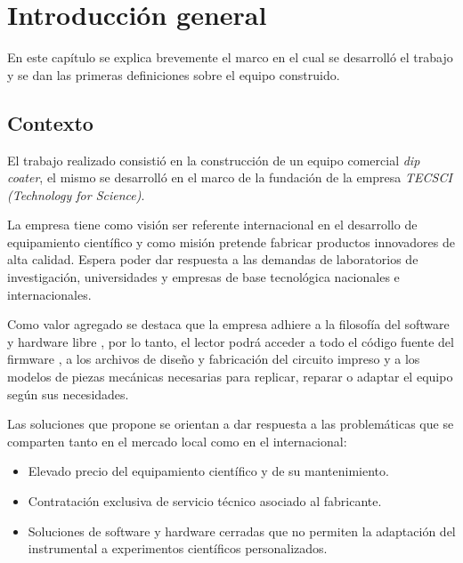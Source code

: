 
\chapter{Introducción general} %

\label{Chapter1} %


En este capítulo se explica brevemente el marco en el cual se desarrolló el trabajo y se dan las primeras definiciones sobre el equipo construido. 
\section{Contexto}

El trabajo realizado consistió en la construcción de un equipo comercial \textit{dip coater}, el mismo se desarrolló en el marco de la fundación de la empresa \textit{TECSCI (Technology for Science)}\citep{web_tecsci}.

La empresa tiene como visión ser referente internacional en el desarrollo de equipamiento científico y como misión pretende fabricar productos innovadores de alta calidad. Espera poder dar respuesta a las demandas de laboratorios de investigación, universidades y empresas de base tecnológica nacionales e internacionales.

Como valor agregado se destaca que la empresa adhiere a la filosofía del software y hardware libre \citep{web_oshwa}, por lo tanto, el lector podrá acceder a todo el código fuente del firmware \citep{web_firmware_tecsci}, a los archivos de diseño y fabricación del circuito impreso \citep{web_hardware_tecsci} y a los modelos de piezas mecánicas necesarias para replicar, reparar o adaptar el equipo según sus necesidades.

Las soluciones que propone se orientan a dar respuesta a las problemáticas que se comparten tanto en el mercado local como en el internacional:
\begin{itemize}
\item Elevado precio del equipamiento científico y de su mantenimiento.
\item Contratación exclusiva de servicio técnico asociado al fabricante.
\item Soluciones de software y hardware cerradas que no permiten la adaptación del instrumental a experimentos científicos personalizados.
\end{itemize}


